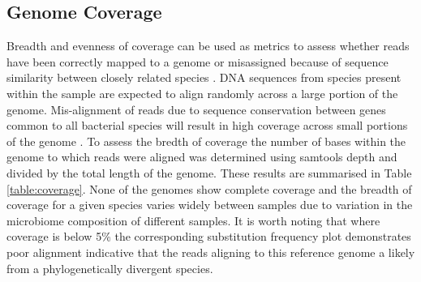 \documentclass[12pt, a4paper]{article}
\begin{document}
\subsection{Genome Coverage}\label{sssec:genomeCoverage}

Breadth and evenness of coverage can be used as metrics to assess whether reads have been correctly mapped to a genome or misassigned because of sequence similarity between closely related species \cite{Warinner:2017aa}. 
DNA sequences from species present within the sample are expected to align randomly across a large portion of the genome. 
Mis-alignment of reads due to sequence conservation between genes common to all bacterial species will result in high coverage across small portions of the genome \cite{Warinner:2017aa}.
To assess the bredth of coverage the number of bases within the genome to which reads were aligned was determined using samtools depth and divided by the total length of the genome. 
These results are summarised in Table \ref{table:coverage}.
None of the genomes show complete coverage and the breadth of coverage for a given species varies widely between samples due to variation in the microbiome composition of different samples.
It is worth noting that where coverage is below 5\% the corresponding substitution frequency plot demonstrates poor alignment indicative that the reads aligning to this reference genome a likely from a phylogenetically divergent species.
\end{document}
